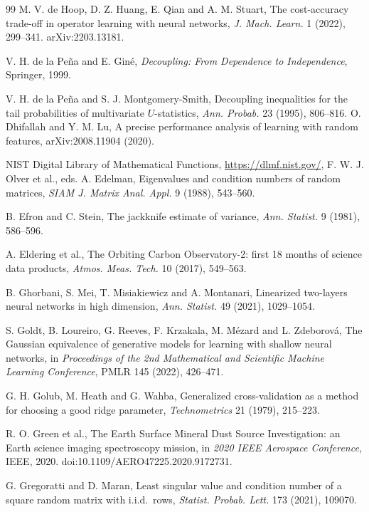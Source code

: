 \documentclass[11pt]{article}
\theoremstyle{definition}
\begin{document}
\begin{thebibliography}{99}
 M. V. de Hoop, D. Z. Huang, E. Qian and A. M. Stuart, The cost-accuracy trade-off
in operator learning with neural networks, \emph{J. Mach. Learn.} 1 (2022), 299--341.
arXiv:2203.13181.


 V. H. de la Pe\~na and E. Gin\'e, \emph{Decoupling: From Dependence to Independence}, Springer, 1999.

 V. H. de la Pe\~na and S. J. Montgomery-Smith, Decoupling inequalities for the tail probabilities of multivariate $U$-statistics, \emph{Ann. Probab.} 23 (1995), 806--816.
 O. Dhifallah and Y. M. Lu, A precise performance analysis of learning with
random features, arXiv:2008.11904 (2020).


 NIST Digital Library of Mathematical Functions, \url{https://dlmf.nist.gov/}, F. W. J. Olver et al., eds.
 A. Edelman, Eigenvalues and condition numbers of random matrices, \emph{SIAM J.
Matrix Anal. Appl.} 9 (1988), 543--560.

 B. Efron and C. Stein, The jackknife estimate of variance, \emph{Ann.
Statist.} 9 (1981), 586--596.

 A. Eldering et al., The Orbiting Carbon Observatory-2: first 18 months of
science data products, \emph{Atmos. Meas. Tech.} 10 (2017), 549--563.

 B. Ghorbani, S. Mei, T. Misiakiewicz and A. Montanari, Linearized two-layers
neural networks in high dimension, \emph{Ann. Statist.} 49 (2021), 1029--1054.

 S. Goldt, B. Loureiro, G. Reeves, F. Krzakala, M. M\'ezard and L. Zdeborov\'a, The
Gaussian equivalence of generative models for learning with shallow neural networks, in
\emph{Proceedings of the 2nd Mathematical and Scientific Machine Learning Conference}, PMLR 145
(2022), 426--471.

 G. H. Golub, M. Heath and G. Wahba, Generalized cross-validation as a method for
choosing a good ridge parameter, \emph{Technometrics} 21 (1979), 215--223.

 R. O. Green et al., The Earth Surface Mineral Dust Source Investigation: an Earth
science imaging spectroscopy mission, in \emph{2020 IEEE Aerospace Conference}, IEEE, 2020.
doi:10.1109/AERO47225.2020.9172731.

 G. Gregoratti and D. Maran, Least singular value and condition number of a
square random matrix with i.i.d.\ rows, \emph{Statist. Probab. Lett.} 173 (2021), 109070.



\end{thebibliography}
\end{document}
